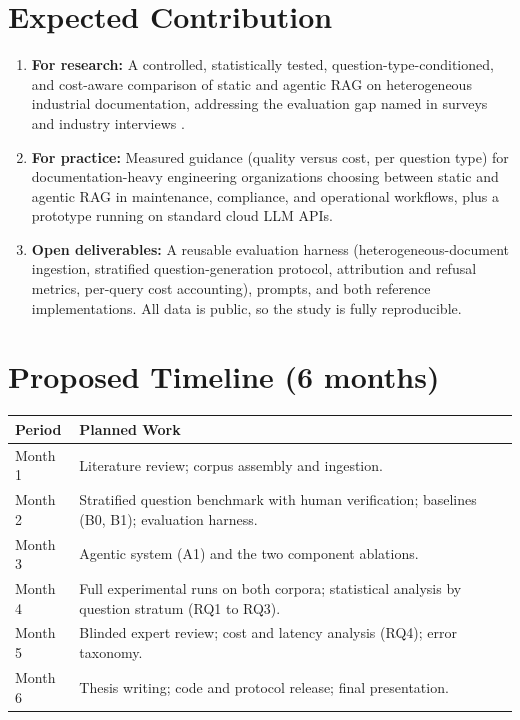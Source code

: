 \documentclass[10pt,a4paper]{article}
\begin{document}
\section{Expected Contribution}

\begin{enumerate}
    \item \textbf{For research:} A controlled, statistically tested, question-type-conditioned, and cost-aware comparison of static and agentic RAG on heterogeneous industrial documentation, addressing the evaluation gap named in surveys and industry interviews \cite{singh2025agentic, ragindustry2025}.
    \item \textbf{For practice:} Measured guidance (quality versus cost, per question type) for documentation-heavy engineering organizations choosing between static and agentic RAG in maintenance, compliance, and operational workflows, plus a prototype running on standard cloud LLM APIs.
    \item \textbf{Open deliverables:} A reusable evaluation harness (heterogeneous-document ingestion, stratified question-generation protocol, attribution and refusal metrics, per-query cost accounting), prompts, and both reference implementations. All data is public, so the study is fully reproducible.
\end{enumerate}

\section{Proposed Timeline (6 months)}

\begin{tabularx}{\textwidth}{|p{2.6cm}|X|}
\hline
\rowcolor{lightgray}
\textbf{Period} & \textbf{Planned Work} \\
\hline
Month 1 & Literature review; corpus assembly and ingestion. \\
\hline
Month 2 & Stratified question benchmark with human verification; baselines (B0, B1); evaluation harness. \\
\hline
Month 3 & Agentic system (A1) and the two component ablations. \\
\hline
Month 4 & Full experimental runs on both corpora; statistical analysis by question stratum (RQ1 to RQ3). \\
\hline
Month 5 & Blinded expert review; cost and latency analysis (RQ4); error taxonomy. \\
\hline
Month 6 & Thesis writing; code and protocol release; final presentation. \\
\hline
\end{tabularx}
\end{document}
